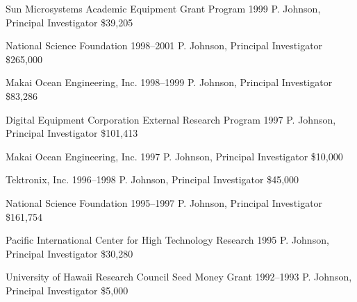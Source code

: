 \documentclass[11pt,letterpaper,sans]{moderncv} %
\begin{document}
        {Sun Microsystems Academic Equipment Grant Program} %
        {1999} %
        {P. Johnson, Principal Investigator}  %
        {\$39,205} %

        {National Science Foundation} %
        {1998--2001} %
        {P. Johnson, Principal Investigator}  %
        {\$265,000} %

        {Makai Ocean Engineering, Inc.} %
        {1998--1999} %
        {P. Johnson, Principal Investigator}  %
        {\$83,286} %

        {Digital Equipment Corporation External Research Program} %
        {1997} %
        {P. Johnson, Principal Investigator}  %
        {\$101,413} %

        {Makai Ocean Engineering, Inc.} %
        {1997} %
        {P. Johnson, Principal Investigator}  %
        {\$10,000} %

        {Tektronix, Inc.} %
        {1996--1998} %
        {P. Johnson, Principal Investigator}  %
        {\$45,000} %

        {National Science Foundation} %
        {1995--1997} %
        {P. Johnson, Principal Investigator}  %
        {\$161,754} %

        {Pacific International Center for High Technology Research} %
        {1995} %
        {P. Johnson, Principal Investigator}  %
        {\$30,280} %

        {University of Hawaii Research Council Seed Money Grant} %
        {1992--1993} %
        {P. Johnson, Principal Investigator}  %
        {\$5,000} %
\end{document}
